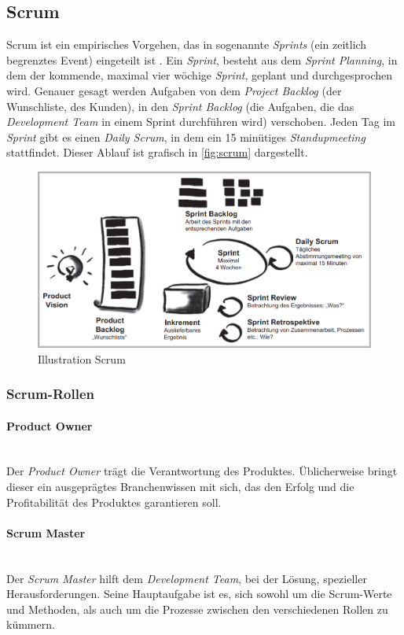 \subsection{Scrum}
Scrum ist ein empirisches Vorgehen, das in sogenannte \textit{Sprints} (ein zeitlich begrenztes Event) eingeteilt ist \cite{pm-agil-ursula}. Ein \textit{Sprint}, besteht aus dem \textit{Sprint Planning}, in dem der kommende, maximal vier wöchige \textit{Sprint}, geplant und durchgesprochen wird. Genauer gesagt werden Aufgaben von dem \textit{Project Backlog} (der Wunschliste, des Kunden), in den \textit{Sprint Backlog} (die Aufgaben, die das \textit{Development Team} in einem Sprint durchführen wird) verschoben. Jeden Tag im \textit{Sprint} gibt es einen \textit{Daily Scrum}, in dem ein 15 minütiges \textit{Standupmeeting} stattfindet. Dieser Ablauf ist grafisch in \autoref{fig:scrum} dargestellt.
\begin{figure}[H]
	\centering
	\includegraphics[width=0.6\linewidth]{images/projektmanagement/scrum2}
	\caption[Scrum]{Illustration Scrum \cite{pm-agil-ursula}}
	\label{fig:scrum}
\end{figure}
\subsubsection{Scrum-Rollen}
\paragraph{Product Owner}~\\
Der \textit{Product Owner} trägt die Verantwortung des Produktes. Üblicherweise bringt dieser ein ausgeprägtes Branchenwissen mit sich, das den Erfolg und die Profitabilität des Produktes garantieren soll.
\paragraph{Scrum Master}~\\
Der \textit{Scrum Master} hilft dem \textit{Development Team}, bei der Lösung, spezieller Herausforderungen. Seine Hauptaufgabe ist es, sich sowohl um die Scrum-Werte und Methoden, als auch um die Prozesse zwischen den verschiedenen Rollen zu kümmern.
